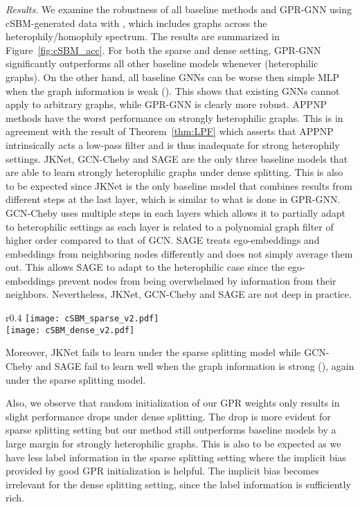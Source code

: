 \documentclass{article} \usepackage{iclr2021_conference,times}
\begin{document}
\emph{Results. } We examine the robustness of all baseline methods and GPR-GNN using cSBM-generated data with , which includes graphs across the heterophily/homophily spectrum. The results are summarized in Figure~\ref{fig:cSBM_acc}. For both the sparse and dense setting, GPR-GNN significantly outperforms all other baseline models whenever  (heterophilic graphs). On the other hand, all baseline GNNs can be worse then simple MLP when the graph information is weak (). This shows that existing GNNs cannot apply to arbitrary graphs, while GPR-GNN is clearly more robust. APPNP methods have the worst performance on strongly heterophilic graphs. This is in agreement with the result of Theorem~\ref{thm:LPF} which asserts that APPNP intrinsically acts a low-pass filter and is thus inadequate for strong heterophily settings. JKNet, GCN-Cheby and SAGE are the only three baseline models that are able to learn strongly heterophilic graphs under dense splitting. This is also to be expected since JKNet is the only baseline model that combines results from different steps at the last layer, which is similar to what is done in GPR-GNN. GCN-Cheby uses multiple steps in each layers which allows it to partially adapt to heterophilic settings as each layer is related to a polynomial graph filter of higher order compared to that of GCN. SAGE treats ego-embeddings and embeddings from neighboring nodes differently and does not simply average them out. This allows SAGE to adapt to the heterophilic case since the ego-embeddings prevent nodes from being overwhelmed by information from their neighbors. Nevertheless, JKNet, GCN-Cheby and SAGE are not deep in practice. 
\setlength{\intextsep}{2pt}\setlength{\columnsep}{8pt}\begin{wrapfigure}{r}{0.4\textwidth}
    \centering
    \texttt{[image: cSBM\_sparse\_v2.pdf]}\\
    \texttt{[image: cSBM\_dense\_v2.pdf]}
    \vspace{-0.8cm}
  \caption{Accuracy of tested models on cSBM. Error bars indicate  confidence interval.}
  \label{fig:cSBM_acc}
\end{wrapfigure}
Moreover, JKNet fails to learn under the sparse splitting model while GCN-Cheby and SAGE fail to learn well when the graph information is strong (), again under the sparse splitting model.

Also, we observe that random initialization of our GPR weights only results in slight performance drops under dense splitting. The drop is more evident for sparse splitting setting but our method still outperforms baseline models by a large margin for strongly heterophilic graphs. This is also to be expected as we have less label information in the sparse splitting setting where the implicit bias provided by good GPR initialization is helpful. The implicit bias becomes irrelevant for the dense splitting setting, since the label information is sufficiently rich.
\end{document}
